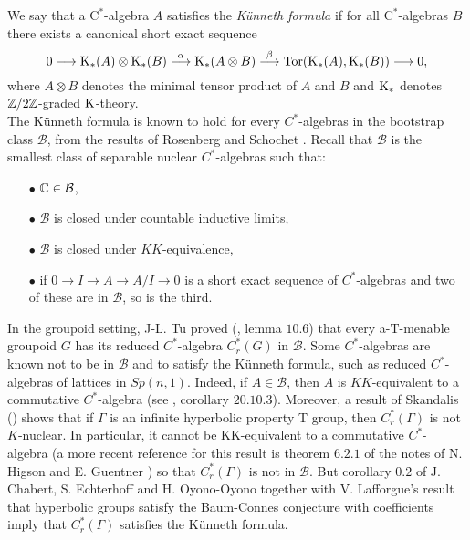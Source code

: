 We say that a $\mathrm{C}^*$-algebra $A$ satisfies the \textit{Künneth formula} if for all $\mathrm{C}^*$-algebras $B$ there exists a canonical short exact sequence
	\begin{equation} \label{KunnethSequence}	
0\longrightarrow \mathrm K_*(A)\otimes \mathrm K_*(B)\stackrel{\alpha}{\longrightarrow}\mathrm K_*(A\otimes B)\stackrel{\beta}{\longrightarrow}\mathrm{Tor}(\mathrm K_*(A),\mathrm K_*(B))\longrightarrow 0,
	\end{equation}
	where $A\otimes B$ denotes the minimal tensor product of $A$ and $B$ and $\mathrm K_*$ denotes $\mathbb Z /2\mathbb Z$-graded $\mathrm K$-theory. \\

The Künneth formula is known to hold for every $C^*$-algebras in the bootstrap class $\mathcal B$, from the results of Rosenberg and Schochet \cite{RosenbergKunneth}. Recall that $\mathcal B$ is the smallest class of separable nuclear $C^*$-algebras such that:
\begin{itemize}
\item[$\bullet$] $\mathbb C \in \mathcal B$,
\item[$\bullet$] $\mathcal B$ is closed under countable inductive limits,  
\item[$\bullet$] $\mathcal B$ is closed under $KK$-equivalence,
\item[$\bullet$] if $0 \rightarrow I \rightarrow A \rightarrow A/I \rightarrow 0$ is a short exact sequence of $C^*$-algebras and two of these are in $\mathcal B$, so is the third. 
\end{itemize}
In the groupoid setting, J-L. Tu proved (\cite{TuThese}, lemma $10.6$) that every a-T-menable groupoid $G$ has its reduced $C^*$-algebra $C^*_r(G)$ in $\mathcal B$. Some $C^*$-algebras are known not to be in $\mathcal B$ and to satisfy the Künneth formula, such as reduced $C^*$-algebras of lattices in $Sp(n,1)$. Indeed, if $A\in \mathcal B$, then $A$ is $KK$-equivalent to a commutative $C^*$-algebra (see \cite{blackadar}, corollary $20.10.3$). Moreover, a result of Skandalis (\cite{SkandalisNotion}) shows that if $\Gamma$ is an infinite hyperbolic property T group, then $C^*_r(\Gamma)$ is not $K$-nuclear. In particular, it cannot be KK-equivalent to a commutative $C^*$-algebra (a more recent reference for this result is theorem $6.2.1$ of the notes of N. Higson and E. Guentner \cite{HigsonGuentnerNotes}) so that $C^*_r(\Gamma)$ is not in $\mathcal B$. But corollary $0.2$ of J. Chabert, S. Echterhoff and H. Oyono-Oyono \cite{ChabertEOY} together with V. Lafforgue's result \cite{lafforgue2012conjecture} that hyperbolic groups satisfy the Baum-Connes conjecture with coefficients imply that $C^*_r(\Gamma)$ satisfies the Künneth formula.\\

